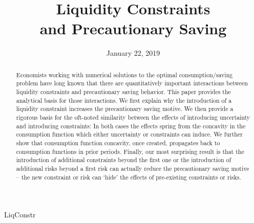 \documentclass[titlepage]{\econtex}
\providecommand{\texname}{LiqConstr}%
\begin{document}


\hfill{\tiny \texname}

\title{Liquidity Constraints \\ and Precautionary Saving}

\newlength\TableWidth


\date{January 22, 2019}
\maketitle




\hypertarget{Abstract}{}
\begin{abstract}
      Economists working with numerical solutions to the optimal consumption/saving problem have long known that there are quantitatively important interactions between liquidity constraints and precautionary saving behavior.  This paper provides the analytical basis for those interactions.  We first explain why the introduction of a liquidity constraint increases the precautionary saving motive. We then provide a rigorous basis for the oft-noted similarity between the effects of introducing uncertainty and introducing constraints: In both cases the effects spring from the concavity in the consumption function which either uncertainty or constraints can induce.  We further show that consumption function concavity, once created, propagates back to consumption functions in prior periods.  Finally, our most surprising result is that the introduction of additional constraints beyond the first one or the introduction of additional risks beyond a first risk can actually reduce the precautionary saving motive -- the new constraint or risk can `hide' the effects of pre-existing constraints or risks.
\end{abstract}
\end{document}

